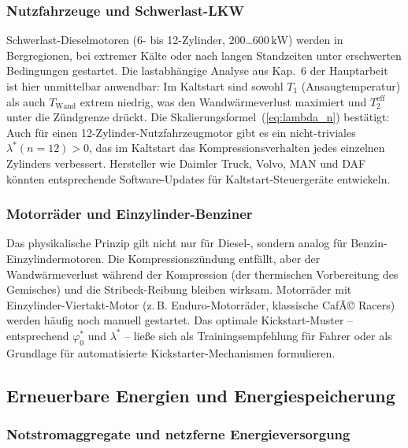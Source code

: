 ﻿\documentclass[a4paper,12pt]{article}
\begin{document}
\subsubsection{Nutzfahrzeuge und Schwerlast-LKW}

Schwerlast-Dieselmotoren (6- bis 12-Zylinder, $200$\ldots$600\,\text{kW}$)
werden in Bergregionen, bei extremer Kälte oder nach langen Standzeiten
unter erschwerten Bedingungen gestartet. Die lastabhängige Analyse
aus Kap.~6 der Hauptarbeit ist hier unmittelbar anwendbar: Im Kaltstart
sind sowohl $T_1$ (Ansaugtemperatur) als auch $T_\text{Wand}$ extrem
niedrig, was den Wandwärmeverlust maximiert und $T_2^\text{eff}$
unter die Zündgrenze drückt. Die Skalierungsformel~(\ref{eq:lambda_n})
bestätigt: Auch für einen 12-Zylinder-Nutzfahrzeugmotor gibt es ein
nicht-triviales $\lambda^*(n=12) > 0$, das im Kaltstart das
Kompressionsverhalten jedes einzelnen Zylinders verbessert.
Hersteller wie Daimler Truck, Volvo, MAN und DAF könnten
entsprechende Software-Updates für Kaltstart-Steuergeräte entwickeln.

\subsubsection{Motorräder und Einzylinder-Benziner}

Das physikalische Prinzip gilt nicht nur für Diesel-,
sondern analog für Benzin-Einzylindermotoren. Die Kompressionszündung
entfällt, aber der Wandwärmeverlust während der Kompression
(der thermischen Vorbereitung des Gemisches) und die
Stribeck-Reibung bleiben wirksam. Motorräder mit Einzylinder-Viertakt-Motor
(z.\,B. Enduro-Motorräder, klassische CafÃ© Racers) werden häufig noch
manuell gestartet. Das optimale Kickstart-Muster -- entsprechend
$\varphi_0^*$ und $\lambda^*$ -- ließe sich als Trainingsempfehlung
für Fahrer oder als Grundlage für automatisierte Kickstarter-Mechanismen
formulieren.

\subsection{Erneuerbare Energien und Energiespeicherung}

\subsubsection{Notstromaggregate und netzferne Energieversorgung}
\end{document}
